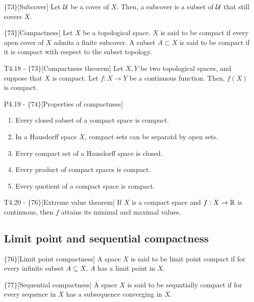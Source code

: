\documentclass{article}
\begin{document}
\begin{flexidefinition}{$\{73\}$}[Subcover]
    Let $\mathcal{U}$ be a cover of $X$. Then, a subcover is a subset of $\mathcal{U}$ that still covers $X$.
\end{flexidefinition}


\begin{flexidefinition}{$\{73\}$}[Compactness]
    Let $X$ be a topological space. $X$ is said to be compact if every open cover of $X$ admits a finite subcover. A subset $A \subset X$ is said to be compact if it is compact with respect to the subset topology.
\end{flexidefinition}

\begin{flexitheorem}{T4.18 - $\{73\}$}[Compactness theorem]
    Let $X,Y$ be two topological spaces, and suppose that $X$ is compact. Let $f : X \to Y$ be a continuous function. Then, $f(X)$ is compact.
\end{flexitheorem}

\begin{flexilemma}{P4.19 - $\{74\}$}[Properties of compactness]
    \begin{enumerate}[label = (\alph*)]
        \item Every closed subset of a compact space is compact.
        \item In a Hausdorff space $X$, compact sets can be separatd by open sets.
        \item Every compact set of a Hausdorff space is closed.
        \item Every product of compact spaces is compact.
        \item Every quotient of a compact space is compact.
    \end{enumerate}
\end{flexilemma}
\begin{flexitheorem}{T4.20 - $\{76\}$}[Extreme value theorem]
    If $X$ is a compact space and $f:X \to \mathbb{R}$ is continuous, then $f$ attains its minimal and maximal values.
\end{flexitheorem}

\subsection{Limit point and sequential compactness}

\begin{flexidefinition}{$\{76\}$}[Limit point compactness]
    A space $X$ is said to be limit point compact if for every infinite subset $A \subseteq X$, $A$ has a limit point in $X$.
    
\end{flexidefinition}
\begin{flexidefinition}{$\{77\}$}[Sequential compactness]
    A space $X$ is said to be sequntially compact if for every sequence in $X$ has a subsequence converging in $X$.
\end{flexidefinition}
\end{document}
